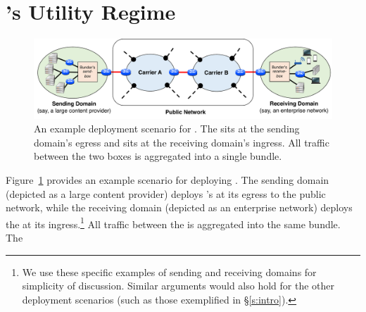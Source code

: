 \section{\name's Utility Regime}

\label{s:deploy}

\begin{figure}
    \centering
    \includegraphics[width=\textwidth]{img/deployment-arch.pdf}
    \caption{An example deployment scenario for \name. 
    The \inbox sits at the sending domain's egress and \outbox sits at the receiving domain's ingress. All traffic between the two boxes is aggregated into a single bundle. 
    }\label{fig:deploy:arch}
\end{figure}


Figure~\ref{fig:deploy:arch}  provides an example scenario for deploying \name. The sending domain (depicted as a large content provider) deploys \name's \inbox at its egress to the public network, while the receiving domain (depicted as an enterprise network) deploys the \outbox at its ingress.\footnote{We use these specific examples of sending and receiving domains for simplicity of discussion. Similar arguments would also hold for the other deployment scenarios (such as those exemplified in \S\ref{s:intro}).} All traffic between the \pair is aggregated into the same bundle. The \inbox {} 

